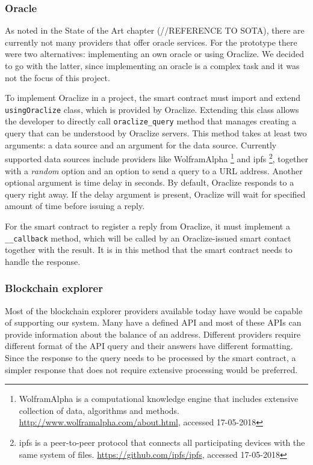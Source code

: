 \subsubsection{Oracle}
As noted in the State of the Art chapter (//REFERENCE TO SOTA), there are currently not many providers that offer oracle services. For the prototype there were two alternatives: implementing an own oracle or using Oraclize. We decided to go with the latter, since implementing an oracle is a complex task and it was not the focus of this project.

To implement Oraclize in a project, the smart contract must import and extend \texttt{usingOraclize} class, which is provided by Oraclize. Extending this class allows the developer to directly call \texttt{oraclize\_query} method that manages creating a query that can be understood by Oraclize servers. This method takes at least two arguments: a data source and an argument for the data source. Currently supported data sources include providers like WolframAlpha%
\footnote{WolframAlpha is a computational knowledge engine that includes extensive collection of data, algorithms and methods. \url{http://www.wolframalpha.com/about.html}, accessed 17-05-2018}%
and \acrshort{ipfs}%
\footnote{\acrfull{ipfs} is a peer-to-peer protocol that connects all participating devices with the same system of files. \url{https://github.com/ipfs/ipfs}, accessed 17-05-2018},%
together with a \textit{random} option and an option to send a query to a URL address. Another optional argument is time delay in seconds. By default, Oraclize responds to a query right away. If the delay argument is present, Oraclize will wait for specified amount of time before issuing a reply.

For the smart contract to register a reply from Oraclize, it must implement a \texttt{\_\_callback} method, which will be called by an Oraclize-issued smart contact together with the result. It is in this method that the smart contract needs to handle the response.
%
% 
% 
\subsubsection{Blockchain explorer}
Most of the blockchain explorer providers available today have would be capable of supporting our system. Many have a defined API and most of these APIs can provide information about the balance of an address. Different providers require different format of the API query and their answers have different formatting. Since the response to the query needs to be processed by the smart contract, a simpler response that does not require extensive processing would be preferred.

